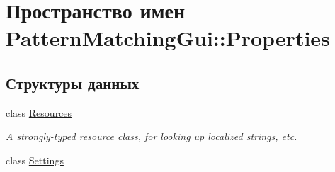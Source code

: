 \hypertarget{namespace_pattern_matching_gui_1_1_properties}{
\section{Пространство имен PatternMatchingGui::Properties}
\label{namespace_pattern_matching_gui_1_1_properties}
}
\subsection*{Структуры данных}
\begin{CompactItemize}
\item 
class \hyperlink{class_pattern_matching_gui_1_1_properties_1_1_resources}{Resources}
\begin{CompactList}\small\item\em A strongly-typed resource class, for looking up localized strings, etc. \item\end{CompactList}\item 
class \hyperlink{class_pattern_matching_gui_1_1_properties_1_1_settings}{Settings}
\end{CompactItemize}
